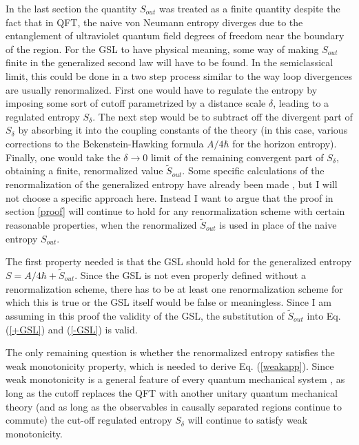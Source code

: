 \documentclass[11pt]{article}
\begin{document}
In the last section the quantity $S_{out}$ was treated as a finite quantity despite the fact that in QFT, the naive von Neumann entropy diverges due to the entanglement of ultraviolet quantum field degrees of freedom near the boundary of the region.  For the GSL to have physical meaning, some way of making $S_{out}$ finite in the generalized second law will have to be found.  In the semiclassical limit, this could be done in a two step process similar to the way loop divergences are usually renormalized.  First one would have to regulate the entropy by imposing some sort of cutoff parametrized by a distance scale $\delta$, leading to a regulated entropy $S_\delta$.  The next step would be to subtract off the divergent part of $S_\delta$ by absorbing it into the coupling constants of the theory (in this case, various corrections to the Bekenstein-Hawking formula $A/{4\hbar}$ for the horizon entropy).  Finally, one would take the $\delta \to 0$ limit of the remaining convergent part of $S_\delta$, obtaining a finite, renormalized value $\tilde{S}_{out}$.  Some specific calculations of the renormalization of the generalized entropy have already been made \cite{FS94}, but I will not choose a specific approach here.  Instead I want to argue that the proof in section \ref{proof} will continue to hold for any renormalization scheme with certain reasonable properties, when the renormalized $\tilde{S}_{out}$ is used in place of the naive entropy $S_{out}$.

The first property needed is that the GSL should hold for the generalized entropy $S = A/{4\hbar} + \tilde{S}_{out}$.  Since the GSL is not even properly defined without a renormalization scheme, there has to be at least one renormalization scheme for which this is true or the GSL itself would be false or meaningless.  Since I am assuming in this proof the validity of the GSL, the substitution of $\tilde{S}_{out}$ into Eq. (\ref{+GSL}) and (\ref{-GSL}) is valid.

The only remaining question is whether the renormalized entropy satisfies the weak monotonicity property, which is needed to derive Eq. (\ref{weakapp}).  Since weak monotonicity is a general feature of every quantum mechanical system \cite{pipp03}, as long as the cutoff replaces the QFT with another unitary quantum mechanical theory (and as long as the observables in causally separated regions continue to commute) the cut-off regulated entropy $S_\delta$ will continue to satisfy weak monotonicity.
\end{document}
